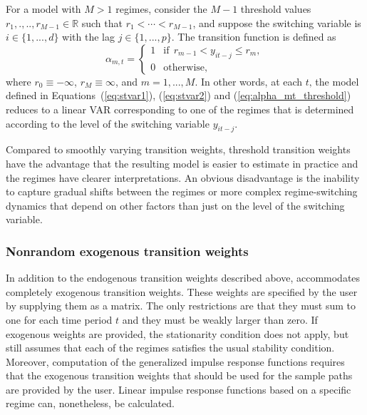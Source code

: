 \documentclass[nojss]{jss}
\begin{document}
For a model with $M>1$ regimes, consider the $M-1$ threshold values $r_1,.,..,r_{M - 1}\in\mathbb{R}$ such that $r_1<\cdots<r_{M-1}$, and suppose the switching variable is $i\in \lbrace 1,...,d \rbrace$ with the lag $j\in \lbrace 1,...,p \rbrace$. The transition function is defined as
\begin{equation}\label{eq:alpha_mt_threshold}
\alpha_{m,t} =
\left\lbrace\begin{matrix}
1 & \text{if} \ \ r_{m-1} < y_{it-j} \leq r_{m}, \\
0 & \text{otherwise}, \phantom{aaaaaaaaa}
\end{matrix}\right.
\end{equation}
where $r_0\equiv-\infty$, $r_M\equiv\infty$, and $m=1,...,M$. In other words, at each $t$‚ the model defined in Equations~(\ref{eq:stvar1}), (\ref{eq:stvar2}) and (\ref{eq:alpha_mt_threshold}) reduces to a linear VAR corresponding to one of the regimes that is determined according to the level of the switching variable $y_{it-j}$.

Compared to smoothly varying transition weights, threshold transition weights have the advantage that the resulting model is easier to estimate in practice and the regimes have clearer interpretations. An obvious disadvantage is the inability to capture gradual shifts between the regimes or more complex regime-switching dynamics that depend on other factors than just on the level of the switching variable.

\subsubsection{Nonrandom exogenous transition weights}

In addition to the endogenous transition weights described above,  accommodates completely exogenous transition weights. These weights are specified by the user by supplying them as a matrix. The only restrictions are that they must sum to one for each time period $t$ and they must be weakly larger than zero. If exogenous weights are provided, the stationarity condition does not apply, but  still assumes that each of the regimes satisfies the usual stability condition. Moreover, computation of the generalized impulse response functions requires that the exogenous transition weights that should be used for the sample paths are provided by the user. Linear impulse response functions based on a specific regime can, nonetheless, be calculated.
\end{document}
